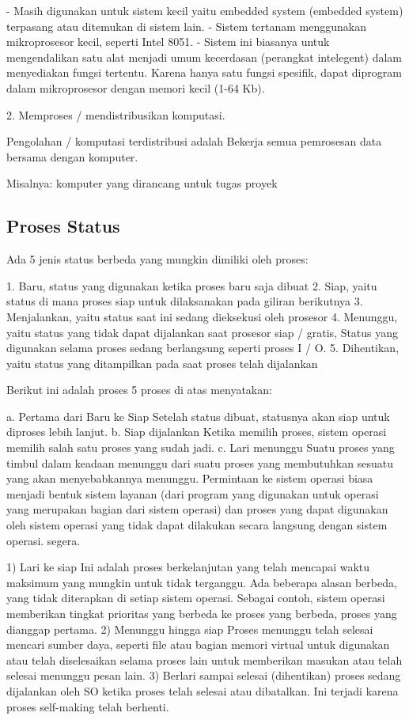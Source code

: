 	- Masih digunakan untuk sistem kecil yaitu embedded system (embedded system) terpasang atau ditemukan di sistem lain.
	- Sistem tertanam menggunakan mikroprosesor kecil, seperti Intel 8051.
	- Sistem ini biasanya untuk mengendalikan satu alat menjadi umum kecerdasan (perangkat intelegent) dalam menyediakan fungsi tertentu. Karena hanya satu fungsi spesifik, dapat diprogram dalam mikroprosesor dengan memori kecil (1-64 Kb).

2. Memproses / mendistribusikan komputasi.

Pengolahan / komputasi terdistribusi adalah Bekerja semua pemrosesan data bersama dengan komputer.

Misalnya: komputer yang dirancang untuk tugas proyek

\subsection {Proses Status}

Ada 5 jenis status berbeda yang mungkin dimiliki oleh proses:

1. Baru, status yang digunakan ketika proses baru saja dibuat
2. Siap, yaitu status di mana proses siap untuk dilaksanakan pada giliran berikutnya
3. Menjalankan, yaitu status saat ini sedang dieksekusi oleh prosesor
4. Menunggu, yaitu status yang tidak dapat dijalankan saat prosesor siap / gratis, Status yang digunakan selama proses sedang berlangsung seperti proses I / O.
5. Dihentikan, yaitu status yang ditampilkan pada saat proses telah dijalankan

Berikut ini adalah proses 5 proses di atas menyatakan:

	a. Pertama dari Baru ke Siap
		Setelah status dibuat, statusnya akan siap untuk diproses lebih lanjut.
	b. Siap dijalankan
		Ketika memilih proses, sistem operasi memilih salah satu proses yang sudah jadi.
	c. Lari menunggu
		Suatu proses yang timbul dalam keadaan menunggu dari suatu proses yang membutuhkan sesuatu yang akan menyebabkannya menunggu. Permintaan ke sistem operasi biasa menjadi bentuk sistem layanan (dari program yang digunakan untuk operasi yang merupakan bagian dari sistem operasi) dan proses yang dapat digunakan oleh sistem operasi yang tidak dapat dilakukan secara langsung dengan sistem operasi. segera.

1) Lari ke siap
	Ini adalah proses berkelanjutan yang telah mencapai waktu maksimum yang mungkin untuk tidak terganggu. Ada beberapa alasan berbeda, yang tidak diterapkan di setiap sistem operasi. Sebagai contoh, sistem operasi memberikan tingkat prioritas yang berbeda ke proses yang berbeda, proses yang dianggap pertama.
2) Menunggu hingga siap
	Proses menunggu telah selesai mencari sumber daya, seperti file atau bagian memori virtual untuk digunakan atau telah diselesaikan selama proses lain untuk memberikan masukan atau telah selesai menunggu pesan lain.
3) Berlari sampai selesai (dihentikan)
	proses sedang dijalankan oleh SO ketika proses telah selesai atau dibatalkan. Ini terjadi karena proses self-making telah berhenti.

